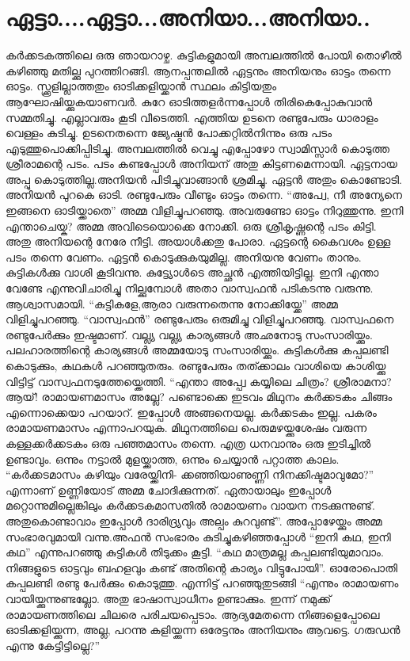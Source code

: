 \chapter{ഏട്ടാ....ഏട്ടാ...അനിയാ...അനിയാ..}
\obeylines
കർക്കടകത്തിലെ ഒരു ഞായറാഴ്ച. കുട്ടികളുമായി അമ്പലത്തിൽ പോയി തൊഴീൽ കഴിഞ്ഞു മതില്ക്കു പുറത്തിറങ്ങി. ആനപ്പന്തലിൽ ഏട്ടനും അനിയനും ഓട്ടം തന്നെ ഓട്ടം. സ്ക്കൂളില്ലാത്തതും ഓടിക്കളിയ്ക്കാൻ സ്ഥലം കിട്ടിയതും ആഘോഷിയ്ക്കുകയാണവർ. കുറേ ഓടിത്തളർന്നപ്പോൾ തിരികെപ്പോകുവാൻ സമ്മതിച്ചു. എല്ലാവരും കൂടി വീടെത്തി. എത്തിയ ഉടനെ രണ്ടുപേരും ധാരാളം വെള്ളം കുടിച്ചു. ഉടനെതന്നെ ജ്യേഷ്ഠൻ പോക്കറ്റിൽനിന്നും ഒരു പടം എടുത്തുപൊക്കിപ്പിടിച്ചു. അമ്പലത്തിൽ വെച്ചു എപ്പോഴോ സ്വാമിസ്സാർ കൊടുത്ത ശ്രീരാമന്റെ പടം. പടം കണ്ടപ്പോൾ അനിയന്‌ അതു കിട്ടണമെന്നായി. ഏട്ടനായ അപ്പു കൊടുത്തില്ല.അനിയൻ പിടിച്ചുവാങ്ങാൻ ശ്രമിച്ചു. ഏട്ടൻ അതും കൊണ്ടോടി. അനിയൻ പുറകെ ഓടി. രണ്ടുപേരും വീണ്ടും ഓട്ടം തന്നെ.
“അപ്വേ, നീ അന്യേനെ ഇങ്ങനെ ഓടിയ്ക്കാതെ” അമ്മ വിളിച്ചുപറഞ്ഞു.
അവരുണ്ടോ ഓട്ടം നിറുത്തുന്നു. ഇനി എന്താചെയ്ക? അമ്മ അവിടെയൊക്കെ നോക്കി. ഒരു ശ്രീകൃഷ്ണന്റെ പടം കിട്ടി. അതു അനിയന്റെ നേരേ നീട്ടി. അയാൾക്കതു പോരാ. ഏട്ടന്റെ കൈവശം ഉള്ള പടം തന്നെ വേണം. ഏട്ടൻ കൊടുക്കുകയുമില്ല. അനിയനു വേണം താനും. കുട്ടികൾക്കു വാശി കൂടിവന്നു. കുട്ട്യോൾടെ അച്ഛൻ എത്തിയിട്ടില്ല. ഇനി എന്താ വേണ്ടേ എന്നുവിചാരിച്ചു നില്ക്കുമ്പോൾ അതാ വാസ്വഫൻ പടികടന്നു വരുന്നു. ആശ്വാസമായി.
“കുട്ടികളേ,ആരാ വരുന്നതെന്നു നോക്കിയ്ക്കേ” അമ്മ വിളിച്ചുപറഞ്ഞു.
“വാസ്വഫൻ” രണ്ടുപേരും ഒരുമിച്ചു വിളിച്ചുപറഞ്ഞു.
വാസ്വഫനെ രണ്ടുപേർക്കും ഇഷ്ടമാണ്‌. വല്ല്യ വല്ല്യ കാര്യങ്ങൾ അഛനോടു സംസാരിയ്ക്കും. പലഹാരത്തിന്റെ കാര്യങ്ങൾ അമ്മയോടു സംസാരിയ്ക്കും. കുട്ടികൾക്കു കപ്പലണ്ടി കൊടുക്കും, കഥകൾ പറഞ്ഞുതരും. രണ്ടുപേരും തത്ക്കാലം വാശിയെ കാശിയ്ക്കു വിട്ടിട്ട് വാസ്വഫനടുത്തേയ്ക്കെത്തി.
“എന്താ അപ്പ്വേ കയ്യിലെ ചിത്രം? ശ്രീരാമനാ?ആയ്! രാമായണമാസം അല്ലേ? പണ്ടൊക്കെ ഇടവം മിഥുനം കർക്കടകം ചിങ്ങം എന്നൊക്കെയാ പറയാറ്‌. ഇപ്പോൾ അങ്ങനെയല്ല. കർക്കടകം ഇല്ല. പകരം രാമായണമാസം എന്നാപറയുക. മിഥുനത്തിലെ പെരുമഴയ്ക്കുശേഷം വരുന്ന കള്ളക്കർക്കടകം ഒരു പഞ്ഞമാസം തന്നെ. എത്ര ധനവാനും ഒരു ഇടിച്ചിൽ ഉണ്ടാവും. ഒന്നും നട്ടാൽ മുളയ്ക്കാത്ത, ഒന്നും ചെയ്യാൻ പറ്റാത്ത കാലം.
“കർക്കടമാസം കഴിയും വരേയ്ക്കിനി-
ക്കഞ്ഞിയാണുണ്ണി നിനക്കിഷ്ടമാവുമോ?”
എന്നാണ്‌ ഉണ്ണിയോട് അമ്മ ചോദിക്കുന്നത്. ഏതായാലും ഇപ്പോൾ മറ്റൊന്നുമില്ലെങ്കിലും കർക്കടകമാസതിൽ രാമായണം വായന നടക്കുന്നുണ്ട്. അതുകൊണ്ടാവാം ഇപ്പോൾ ദാരിദ്ര്യവും അല്പം കുറവുണ്ട്”.
അപ്പോഴേയ്ക്കും അമ്മ സംഭാരവുമായി വന്നു.അഫൻ സംഭാരം കുടിച്ചുകഴിഞ്ഞപ്പോൾ “ഇനി കഥ, ഇനി കഥ” എന്നുപറഞ്ഞു കുട്ടികൾ തിടുക്കം കൂട്ടി.
“കഥ മാത്രമല്ല കപ്പലണ്ടിയുമാവാം. നിങ്ങളുടെ ഓട്ടവും ബഹളവും കണ്ട് അതിന്റെ കാര്യം വിട്ടുപോയി”. ഓരോപൊതി കപ്പലണ്ടി രണ്ടു പേർക്കും കൊടുത്തു. എന്നിട്ട് പറഞ്ഞുതുടങ്ങി
“എന്നും രാമായണം വായിയ്ക്കുന്നുണ്ടല്ലോ. അതു ഭാഷാസ്വാധീനം ഉണ്ടാക്കും. ഇന്ന് നമുക്ക് രാമായണത്തിലെ ചിലരെ പരിചയപ്പെടാം. ആദ്യമേതന്നെ നിങ്ങളെപ്പോലെ ഓടിക്കളിയ്ക്കുന്ന, അല്ല, പറന്നു കളിയ്ക്കുന്ന ഒരേട്ടനും അനിയനും ആവട്ടെ. ഗരുഡൻ എന്നു കേട്ടിട്ടില്ലെ?”
